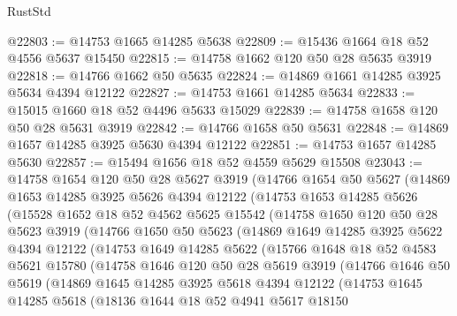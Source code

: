 \begin{lexlean}{RustStd}
\begin{coremodule}
@22803 := @14753 @1665 @14285 @5638
@22809 := @15436 @1664 @18 @52 @4556 @5637 @15450
@22815 := @14758 @1662 @120 @50 @28 @5635 @3919
@22818 := @14766 @1662 @50 @5635
@22824 := @14869 @1661 @14285 @3925 @5634 @4394 @12122
@22827 := @14753 @1661 @14285 @5634
@22833 := @15015 @1660 @18 @52 @4496 @5633 @15029
@22839 := @14758 @1658 @120 @50 @28 @5631 @3919
@22842 := @14766 @1658 @50 @5631
@22848 := @14869 @1657 @14285 @3925 @5630 @4394 @12122
@22851 := @14753 @1657 @14285 @5630
@22857 := @15494 @1656 @18 @52 @4559 @5629 @15508
@23043 := @14758
    @1654
    @120
    @50
    @28
    @5627
    @3919
    (@14766
      @1654
      @50
      @5627
      (@14869
        @1653
        @14285
        @3925
        @5626
        @4394
        @12122
        (@14753
          @1653
          @14285
          @5626
          (@15528
            @1652
            @18
            @52
            @4562
            @5625
            @15542
            (@14758
              @1650
              @120
              @50
              @28
              @5623
              @3919
              (@14766
                @1650
                @50
                @5623
                (@14869
                  @1649
                  @14285
                  @3925
                  @5622
                  @4394
                  @12122
                  (@14753
                    @1649
                    @14285
                    @5622
                    (@15766
                      @1648
                      @18
                      @52
                      @4583
                      @5621
                      @15780
                      (@14758
                        @1646
                        @120
                        @50
                        @28
                        @5619
                        @3919
                        (@14766
                          @1646
                          @50
                          @5619
                          (@14869
                            @1645
                            @14285
                            @3925
                            @5618
                            @4394
                            @12122
                            (@14753
                              @1645
                              @14285
                              @5618
                              (@18136
                                @1644
                                @18
                                @52
                                @4941
                                @5617
                                @18150

\end{coremodule}
\end{lexlean}
